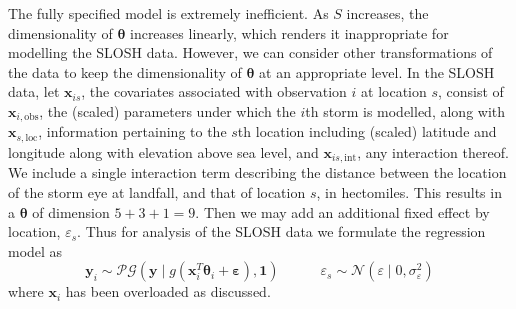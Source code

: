 The fully specified model is extremely inefficient. As $S$ increases, the dimensionality of
    $\bm{\theta}$ increases linearly, which renders it inappropriate for modelling the SLOSH data.  
    However, we can consider other transformations of the data to keep the dimensionality of 
    $\bm{\theta}$ at an appropriate level. In the SLOSH data, let $\bm{x}_{is}$, the covariates 
    associated with observation $i$ at location $s$, consist of $\bm{x}_{i,\text{obs}}$, the 
    (scaled) parameters under which the $i$th storm is modelled, along with $\bm{x}_{s,\text{loc}}$, 
    information pertaining to the $s$th location including (scaled) latitude and longitude along with
    elevation above sea level, and $\bm{x}_{is,\text{int}}$, any interaction thereof.
    We include a single interaction term describing the distance between the location of the storm eye 
    at landfall, and that of location $s$, in hectomiles. This results in a $\bm{\theta}$ of dimension 
    $5 + 3 + 1 = 9$.  Then we may add an additional fixed effect by location, $\varepsilon_s$.  Thus for 
    analysis of the SLOSH data we formulate the regression model as
    \begin{equation}
        \label{eqn:regressionmodelredux}
        \bm{y}_i \sim 
            \mathcal{PG}\left(\bm{y}\mid g(\bm{x}_i^T\bm{\theta}_i + \bm{\varepsilon}), \bm{1}\right)
            \;\hspace{1cm}\;
            \varepsilon_s \sim \mathcal{N}(\varepsilon \mid 0, \sigma_{\varepsilon}^2)
    \end{equation}
    where $\bm{x}_i$ has been overloaded as discussed.
    
